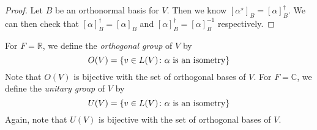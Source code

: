 \begin{proof}
	Let \( B \) be an orthonormal basis for \( V \).
	Then we know \( [\alpha^\star]_B = [\alpha]_B^\dagger \).
	We can then check that \( [\alpha]_B^\dagger = [\alpha]_B \) and \( [\alpha]_B^\dagger = [\alpha]_B^{-1} \) respectively.
\end{proof}
\begin{definition}
	For \( F = \mathbb R \), we define the \textit{orthogonal group} of \( V \) by
	\[
		O(V) = \qty{ v \in L(V) \colon \alpha \text{ is an isometry} }
	\]
	Note that \( O(V) \) is bijective with the set of orthogonal bases of \( V \).
	For \( F = \mathbb C \), we define the \textit{unitary group} of \( V \) by
	\[
		U(V) = \qty{ v \in L(V) \colon \alpha \text{ is an isometry} }
	\]
	Again, note that \( U(V) \) is bijective with the set of orthogonal bases of \( V \).
\end{definition}

